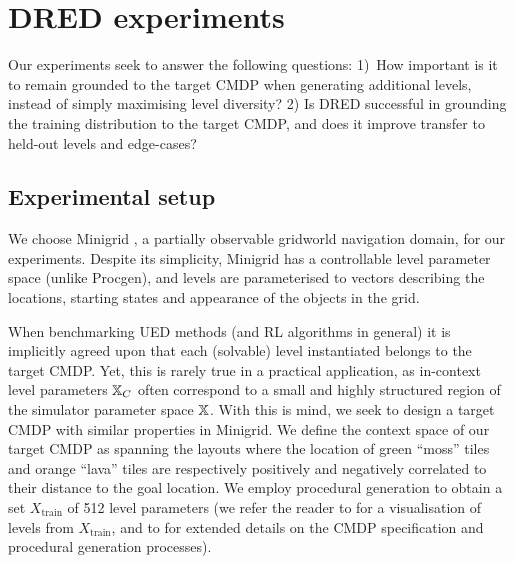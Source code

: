 \section{DRED experiments}\label{c3:sec:minigrid}
Our experiments seek to answer the following questions: 1)~How important is it to remain grounded to the target CMDP when generating additional levels, instead of simply maximising level diversity? 2) Is DRED successful in grounding the training distribution to the target CMDP, and does it improve transfer to held-out levels and edge-cases?
\subsection{Experimental setup}
 We choose Minigrid \citep{gym_minigrid}, a partially observable gridworld navigation domain, for our experiments. Despite its simplicity, Minigrid has a controllable level parameter space (unlike Procgen), and levels are parameterised to vectors describing the locations, starting states and appearance of the objects in the grid. 
 
When benchmarking UED methods (and RL algorithms in general) it is implicitly agreed upon that each (solvable) level instantiated belongs to the target CMDP. Yet, this is rarely true in a practical application, as in-context level parameters ${\mathbb{X}}_C$ often correspond to a small and highly structured region of the simulator parameter space ${\mathbb{X}}$. With this is mind, we seek to design a target CMDP with similar properties in Minigrid. We define the context space of our target CMDP as spanning the layouts where the location of green ``moss'' tiles and orange ``lava'' tiles are respectively positively and negatively correlated to their distance to the goal location. 
We employ procedural generation to obtain a set $X_\text{train}$ of 512 level parameters (we refer the reader to  for a visualisation of levels from $X_\text{train}$, and to  for extended details on the CMDP specification and procedural generation processes).

